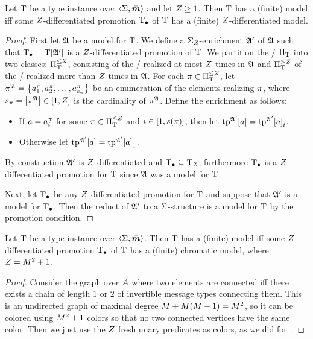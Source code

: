 \begin{remark}\label{rem:z-diff}
Let $\mathrm{T}$ be a type instance over $\left\langle \mathrm{\Sigma},\bar{\bm{m}} \right\rangle$ and let $Z\geq1$.
Then $\mathrm{T}$ has a (finite) model
iff some $Z$-differentiated promotion $\mathrm{T}_{\bullet}$ of $\mathrm{T}$ has a (finite)
$Z$-differentiated model.
\end{remark}
\begin{proof}
First let $\mathfrak{A}$ be a model for $\mathrm{T}$.
We define a ${\mathrm{\Sigma}}_{Z}$-enrichment $\mathfrak{A'}$ of $\mathfrak{A}$ such that $\mathrm{T}_{\bullet} =
\mathrm{T}[\mathfrak{A'}]$ is a $Z$-differentiated promotion of $\mathrm{T}$.
We partition the \onetypes/ ${\Pi}_{\mathrm{T}}$ into two classes: ${\Pi}_{\mathrm{T}}^{\leq Z}$,
consisting of the \onetypes/ realized at most $Z$ times in $\mathfrak{A}$ and
${\Pi}_{\mathrm{T}}^{>Z}$ of the \onetypes/ realized more than $Z$ times in $\mathfrak{A}$.
For each $\pi\in{\Pi}_{\mathrm{T}}^{\leq Z}$, let
$\pi^{\mathfrak{A}} = \left\{a_1^\pi,a_2^\pi,\dots,a_{s_\pi}^\pi\right\}$ be an
enumeration of the elements realizing $\pi$, where
$s_\pi=\left|\pi^{\mathfrak{A}}\right|\in[1,Z]$ is the cardinality of $\pi^{\mathfrak{A}}$.
Define the enrichment as follows:
\begin{itemize}
  \item If $a = a_i^\pi$ for some $\pi\in{\Pi}_{\mathrm{T}}^{\leq Z}$ and
  $i\in[1,s(\pi)]$, then let $\operatorname{tp}^{\mathfrak{A'}}[a] = {\operatorname{tp}^{\mathfrak{A'}}[a]}_{i}$.
  \item Otherwise let $\operatorname{tp}^{\mathfrak{A'}}[a] = {\operatorname{tp}^{\mathfrak{A'}}[a]}_{1}$.
\end{itemize}
By construction $\mathfrak{A'}$ is $Z$-differentiated and $\mathrm{T}_{\bullet}\subseteq{\mathrm{T}}_{Z}$;
furthermore $\mathrm{T}_{\bullet}$ is a $Z$-differentiated promotion for $\mathrm{T}$ since $\mathfrak{A}$
was a model for $\mathrm{T}$.

Next, let $\mathrm{T}_{\bullet}$ be any $Z$-differentiated promotion for $\mathrm{T}$ and suppose
that $\mathfrak{A'}$ is a model for $\mathrm{T}_{\bullet}$. Then the reduct of $\mathfrak{A'}$ to a
$\mathrm{\Sigma}$-structure is a model for $\mathrm{T}$ by the promotion condition.
\end{proof}




\begin{remark}\label{rem:step-chromatic}
Let $\mathrm{T}$ be a type instance over $\left\langle \mathrm{\Sigma},\bar{\bm{m}} \right\rangle$.
Then $\mathrm{T}$ has a (finite) model iff some $Z$-differentiated promotion $\mathrm{T}_{\bullet}$
of $\mathrm{T}$ has a (finite) chromatic model, where $Z = M^2+1$.
\end{remark}
\begin{proof}
Consider the graph over $A$ where two elements are connected iff there
exists a chain of length $1$ or $2$ of invertible message types connecting them.
This is an undirected graph of maximal degree $M + M(M-1) = M^2$, so it
can be colored using $M^2+1$ colors so that no two connected vertices have the
same color.
Then we just use the $Z$ fresh unary predicates as colors, as we did
for~.
\end{proof}

